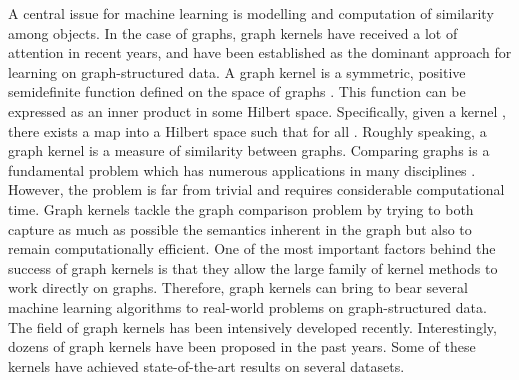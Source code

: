 \documentclass[twoside,11pt]{article}
\begin{document}
A central issue for machine learning is modelling and computation of similarity among objects.
In the case of graphs, graph kernels have received a lot of attention in recent years, and have been established as the dominant approach for learning on graph-structured data.
A graph kernel is a symmetric, positive semidefinite function defined on the space of graphs .
This function can be expressed as an inner product in some Hilbert space.
Specifically, given a kernel , there exists a map  into a Hilbert space  such that  for all .
Roughly speaking, a graph kernel is a measure of similarity between graphs.
Comparing graphs is a fundamental problem which has numerous applications in many disciplines \cite{conte2004thirty}.
However, the problem is far from trivial and requires considerable computational time.
Graph kernels tackle the graph comparison problem by trying to both capture as much as possible the semantics inherent in the graph but also to remain computationally efficient.
One of the most important factors behind the success of graph kernels is that they allow the large family of kernel methods to work directly on graphs.
Therefore, graph kernels can bring to bear several machine learning algorithms to real-world problems on graph-structured data.
The field of graph kernels has been intensively developed recently.
Interestingly, dozens of graph kernels have been proposed in the past  years.
Some of these kernels have achieved state-of-the-art results on several datasets.
\end{document}
